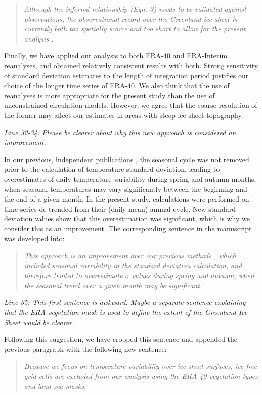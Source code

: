 \documentclass[10pt]{article}
\def\referee#1{\bigskip\textcolor{blue!50!black}{\textit{#1}}}
\def\msquote#1{\begin{quote}\textit{#1}\end{quote}}
\begin{document}
\msquote{Although the inferred relationship (Eqn. 3) needs to be validated against observations, the observational record over the Greenland ice sheet is currently both too spatially scarce and too short to allow for the present analysis \citep{rogozhina-rau-2014}.}

Finally, we have applied our analysis to both ERA-40 and ERA-Interim reanalyses, and obtained relatively consistent results with both. Strong sensitivity of standard deviation estimates to the length of integration period \citep{rogozhina-rau-2014} justifies our choice of the longer time series of ERA-40. We also think that the use of reanalyses is more appropriate for the present study than the use of unconstrained circulation models. However, we agree that the coarse resolution of the former may affect our estimates in areas with steep ice sheet topography.

\referee{Line 32-34: Please be clearer about why this new approach is considered an improvement.}

In our previous, independent publications \citep{seguinot-2013,rogozhina-rau-2014}, the seasonal cycle was not removed prior to the calculation of temperature standard deviation, leading to overestimates of daily temperature variability during spring and autumn months, when seasonal temperatures may vary significantly between the beginning and the end of a given month. In the present study, calculations were performed on time-series de-trended from their (daily mean) annual cycle. New standard deviation values show that this overestimation was significant, which is why we consider this as an improvement. The corresponding sentence in the manuscript was developed into:

\msquote{This approach is an improvement over our previous methods \citep{seguinot-2013,rogozhina-rau-2014}, which included seasonal variability in the standard deviation calculation, and therefore tended to overestimate $\sigma$ values during spring and autumn, when the seasonal trend over a given month may be significant.}

\referee{Line 35: This first sentence is awkward. Maybe a separate sentence explaining that the ERA vegetation mask is used to define the extent of the Greenland Ice Sheet would be clearer.}

Following this suggestion, we have cropped this sentence and appended the previous paragraph with the following new sentence:

\msquote{Because we focus on temperature variability over ice sheet surfaces, ice-free grid cells are excluded from our analysis using the ERA-40 vegetation types and land-sea masks.}
\end{document}

